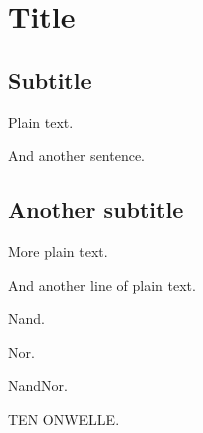 \documentclass{article}
\begin{document}
\section{Title}



\subsection{Subtitle}

Plain text.

And another sentence.

\subsection{Another subtitle}

More plain text.

And another line of plain text.

Nand.

Nor.

NandNor.

TEN ONWELLE.
\end{document}
